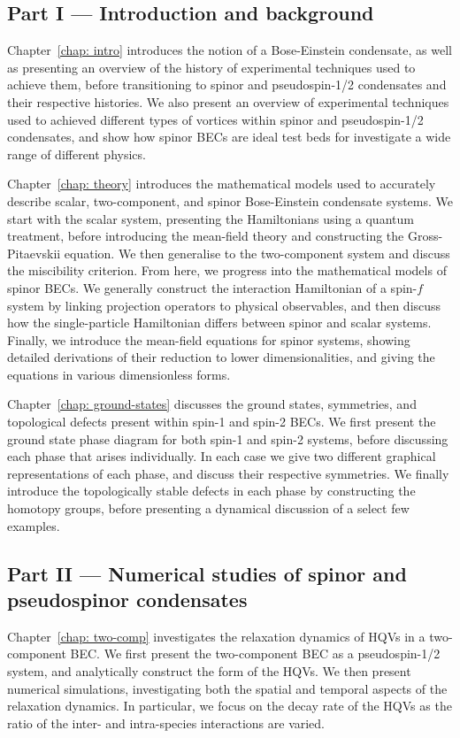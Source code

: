 \subsection*{Part I --- Introduction and background}
Chapter~\ref{chap: intro} introduces the notion of a Bose-Einstein condensate,
as well as presenting an overview of the history of experimental techniques used
to achieve them, before transitioning to spinor and pseudospin-1/2 condensates
and their respective histories.
We also present an overview of experimental techniques used to achieved
different types of vortices within spinor and pseudospin-1/2 condensates, and
show how spinor BECs are ideal test beds for investigate a wide range of
different physics.

Chapter~\ref{chap: theory} introduces the mathematical models used to accurately
describe scalar, two-component, and spinor Bose-Einstein condensate systems.
We start with the scalar system, presenting the Hamiltonians using a quantum
treatment, before introducing the mean-field theory and constructing the
Gross-Pitaevskii equation.
We then generalise to the two-component system and discuss the miscibility
criterion.
From here, we progress into the mathematical models of spinor BECs.
We generally construct the interaction Hamiltonian of a spin-\(f\) system by
linking projection operators to physical observables, and then discuss how the
single-particle Hamiltonian differs between spinor and scalar systems.
Finally, we introduce the mean-field equations for spinor systems, showing
detailed derivations of their reduction to lower dimensionalities, and giving
the equations in various dimensionless forms.

Chapter~\ref{chap: ground-states} discusses the ground states, symmetries, and
topological defects present within spin-1 and spin-2 BECs.
We first present the ground state phase diagram for both spin-1 and spin-2
systems, before discussing each phase that arises individually.
In each case we give two different graphical representations of each phase, and
discuss their respective symmetries.
We finally introduce the topologically stable defects in each phase by
constructing the homotopy groups, before presenting a dynamical discussion of
a select few examples.

\subsection*{Part II --- Numerical studies of spinor and pseudospinor
    condensates}
Chapter~\ref{chap: two-comp} investigates the relaxation dynamics of HQVs in a
two-component BEC\@.
We first present the two-component BEC as a pseudospin-1/2 system, and
analytically construct the form of the HQVs.
We then present numerical simulations, investigating both the spatial and
temporal aspects of the relaxation dynamics.
In particular, we focus on the decay rate of the HQVs as the ratio of the inter-
and intra-species interactions are varied.

